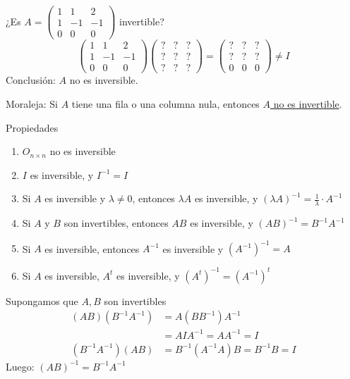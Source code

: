 \documentclass[11pt,a4paper]{article}
\begin{document}
\begin{ejemplo}
¿Es $A=\begin{pmatrix}1&1&2\\1&-1&-1\\0&0&0\end{pmatrix}$ invertible?
\[
\begin{pmatrix}1&1&2\\1&-1&-1\\0&0&0\end{pmatrix}
\begin{pmatrix}?&?&?\\?&?&?\\?&?&?\end{pmatrix}
=\begin{pmatrix}?&?&?\\?&?&?\\0&0&0\end{pmatrix}\neq I
\]
Conclusión: $A$ no es inversible.
\end{ejemplo}

Moraleja: Si $A$ tiene una fila o una columna nula, entonces \underline{$A$ no es invertible}.

Propiedades
\begin{enumerate}[label=(\arabic*),start=0]
  \item $O_{n\times n}$ no es inversible
  \item $I$ es inversible, y $I^{-1}=I$
  \item Si $A$ es inversible y $\lambda\neq0$, entonces $\lambda A$ es inversible, y $(\lambda A)^{-1}=\frac{1}{\lambda}\cdot A^{-1}$
  \item Si $A$ y $B$ son invertibles, entonces $AB$ es inversible, y $(AB)^{-1}=B^{-1}A^{-1}$
  \item Si $A$ es inversible, entonces $A^{-1}$ es inversible y $(A^{-1})^{-1}=A$
  \item Si $A$ es inversible, $A^t$ es inversible, y $(A^t)^{-1}=(A^{-1})^t$
\end{enumerate}

\begin{demo}[Demostración de (3)]
Supongamos que $A,B$ son invertibles
\begin{align*}
(AB)(B^{-1}A^{-1})&=A(BB^{-1})A^{-1}\\
&=AIA^{-1}=AA^{-1}=I\\
(B^{-1}A^{-1})(AB)&=B^{-1}(A^{-1}A)B=B^{-1}B=I
\end{align*}
Luego: $(AB)^{-1}=B^{-1}A^{-1}$
\end{demo}
\end{document}
